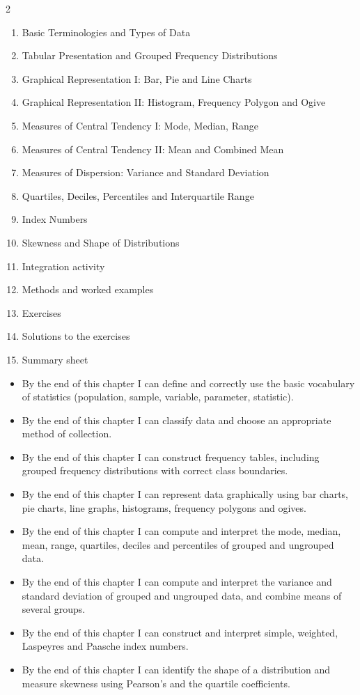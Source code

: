 \documentclass[11pt]{article}
\begin{document}
\begin{sommaire}
\begin{multicols}{2}
\begin{enumerate}
\item Basic Terminologies and Types of Data
\item Tabular Presentation and Grouped Frequency Distributions
\item Graphical Representation I: Bar, Pie and Line Charts
\item Graphical Representation II: Histogram, Frequency Polygon and Ogive
\item Measures of Central Tendency I: Mode, Median, Range
\item Measures of Central Tendency II: Mean and Combined Mean
\item Measures of Dispersion: Variance and Standard Deviation
\item Quartiles, Deciles, Percentiles and Interquartile Range
\item Index Numbers
\item Skewness and Shape of Distributions
\item Integration activity
\item Methods and worked examples
\item Exercises
\item Solutions to the exercises
\item Summary sheet
\end{enumerate}
\end{multicols}
\end{sommaire}

\begin{objectifs}
\begin{itemize}
\item By the end of this chapter I can define and correctly use the basic vocabulary of statistics (population, sample, variable, parameter, statistic).
\item By the end of this chapter I can classify data and choose an appropriate method of collection.
\item By the end of this chapter I can construct frequency tables, including grouped frequency distributions with correct class boundaries.
\item By the end of this chapter I can represent data graphically using bar charts, pie charts, line graphs, histograms, frequency polygons and ogives.
\item By the end of this chapter I can compute and interpret the mode, median, mean, range, quartiles, deciles and percentiles of grouped and ungrouped data.
\item By the end of this chapter I can compute and interpret the variance and standard deviation of grouped and ungrouped data, and combine means of several groups.
\item By the end of this chapter I can construct and interpret simple, weighted, Laspeyres and Paasche index numbers.
\item By the end of this chapter I can identify the shape of a distribution and measure skewness using Pearson's and the quartile coefficients.
\end{itemize}
\end{objectifs}
\end{document}
